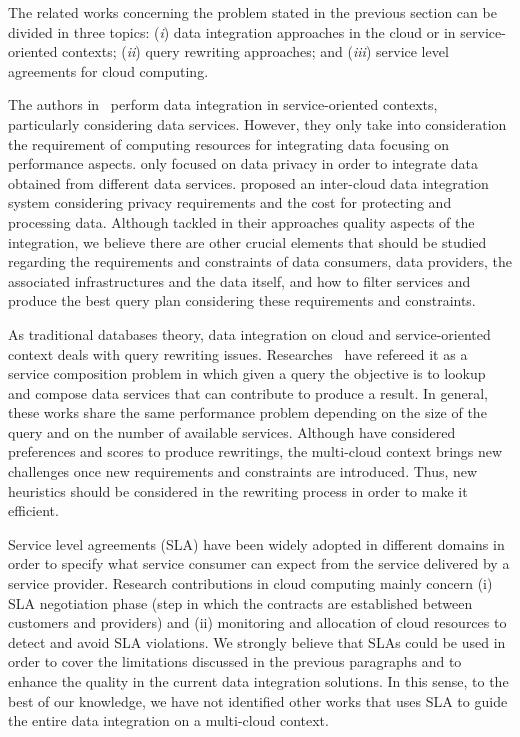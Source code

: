 The related works concerning the problem stated in the previous section can be divided in three topics: (\textit{i}) data integration approaches in the cloud or in service-oriented contexts; (\textit{ii}) query rewriting approaches; and (\textit{iii}) service level agreements for cloud computing.

The authors in~\cite{Correndo2010,ElSheikh2013} perform data integration in service-oriented contexts, particularly considering data services. However, they only take into consideration the requirement of computing resources for integrating data focusing on performance aspects. \cite{YauY08} only focused on data privacy in order to integrate data obtained from different data services. \cite{Tian2010} proposed an inter-cloud data integration system considering privacy requirements and the cost for protecting and processing data. Although \cite{Tian2010,YauY08} tackled in their approaches quality aspects of the integration, we believe there are other crucial elements that should be studied regarding the requirements and constraints of data consumers, data providers, the associated infrastructures and the data itself, and how to filter services and produce the best query plan considering these requirements and constraints.

As traditional databases theory, data integration on cloud and service-oriented context deals with query rewriting issues. Researches~\cite{ba2014,Barhamgi2010,Benouaret2011,Umberto} have refereed it as a service composition problem in which given a query the objective is to lookup and compose data services that can contribute to produce a result. In general, these works share the same performance problem depending on the size of the query and on the number of available services. Although \cite{ba2014,Benouaret2011} have considered preferences and scores to produce rewritings, the multi-cloud context brings new challenges once new requirements and constraints are introduced. Thus, new heuristics should be considered in the rewriting process in order to make it efficient. 

Service level agreements (SLA) have been widely adopted in different domains in order to specify what service consumer can expect from the service delivered by a service provider. Research contributions in cloud computing mainly concern (i) SLA negotiation phase (step in which the contracts are established between customers and providers) and (ii) monitoring and allocation of cloud resources to detect and avoid SLA violations. We strongly believe that SLAs could be used in order to cover the limitations discussed in the previous paragraphs and to enhance the quality in the current data integration solutions. In this sense, to the best of our knowledge, we have not identified other works that uses SLA to guide the entire data integration on a multi-cloud context.

